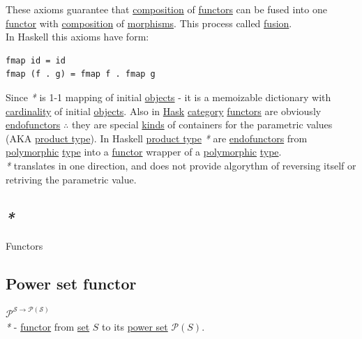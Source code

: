 \documentclass[a4paper,14pt,oneside]{book}
\begin{document}
These axioms guarantee that \hyperref[orgcf7d368]{composition} of \hyperref[org7f51692]{functors} can be fused into one \hyperref[orgf855504]{functor} with \hyperref[orgcf7d368]{composition} of \hyperref[org877a4d9]{morphisms}. This process called \hyperref[orge729796]{fusion}.\\

In Haskell this axioms have form:\\
\begin{verbatim}
fmap id = id
fmap (f . g) = fmap f . fmap g
\end{verbatim}

Since \emph{*} is 1-1 mapping of initial \hyperref[orgd42a7f2]{objects} - it is a memoizable dictionary with \hyperref[org9afe12b]{cardinality} of initial \hyperref[orgd42a7f2]{objects}. Also in \hyperref[org19590af]{Hask} \hyperref[orgc2c97e7]{category} \hyperref[org7f51692]{functors} are obviously \hyperref[org4be6005]{endofunctors} \(\therefore\) they are special \hyperref[org558ce98]{kinds} of containers for the parametric values (AKA \hyperref[org9ea356a]{product type}). In Haskell \hyperref[org9ea356a]{product type} \emph{*} are \hyperref[org4be6005]{endofunctors} from \hyperref[orgd6cf35f]{polymorphic} \hyperref[orgc4a7610]{type} into a \hyperref[orgf855504]{functor} wrapper of a \hyperref[orgd6cf35f]{polymorphic} \hyperref[orgc4a7610]{type}.\\

\emph{*} translates in one direction, and does not provide algorythm of reversing itself or retriving the parametric value.\\

\subsection{\emph{*}}
\label{sec:org0ff918d}

\label{org7f51692}Functors\\

\subsection{\label{orga76836a}Power set functor}
\label{sec:orgd64f0bf}
\(\mathcal{P^{S \to P(S)}}\)\\

\emph{*} - \hyperref[orgf855504]{functor} from \hyperref[org0f7f8fa]{set} \(S\) to its \hyperref[org05db14f]{power set} \(\mathcal{P}(S)\).\\
\end{document}
